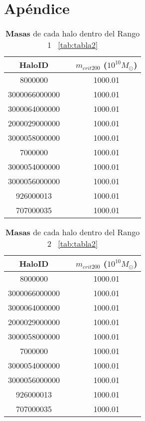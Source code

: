 \section*{Apéndice} 
\label{sec:apendice} %


\begin{table}[H]
\begin{center}
\begin{tabular}{ccc}
\toprule
\cellcolor[gray]{0.9}HaloID & & \cellcolor[gray]{0.9}$m_{crit200}$ ($10^{10}M_\odot$) \\
\midrule
8000000 & & 1000.01 \\
\midrule
3000066000000 & & 1000.01 \\
\midrule
3000064000000 & & 1000.01 \\
\midrule
2000029000000 & & 1000.01 \\
\midrule
3000058000000 & & 1000.01 \\
\midrule
7000000 & & 1000.01 \\
\midrule
3000054000000 & & 1000.01 \\
\midrule
3000056000000 & & 1000.01 \\
\midrule
926000013 & & 1000.01 \\
\midrule
707000035 & & 1000.01 \\
\bottomrule
\end{tabular}
\end{center}
\caption{\textbf{Masas} de cada halo dentro del Rango 1 ~\ref{tab:tabla2}}
\label{tab:tabla3}
\end{table}

\begin{table}[H]
\begin{center}
\begin{tabular}{ccc}
\toprule
\cellcolor[gray]{0.9}HaloID & & \cellcolor[gray]{0.9}$m_{crit200}$ ($10^{10}M_\odot$) \\
\midrule
8000000 & & 1000.01 \\
\midrule
3000066000000 & & 1000.01 \\
\midrule
3000064000000 & & 1000.01 \\
\midrule
2000029000000 & & 1000.01 \\
\midrule
3000058000000 & & 1000.01 \\
\midrule
7000000 & & 1000.01 \\
\midrule
3000054000000 & & 1000.01 \\
\midrule
3000056000000 & & 1000.01 \\
\midrule
926000013 & & 1000.01 \\
\midrule
707000035 & & 1000.01 \\
\bottomrule
\end{tabular}
\end{center}
\caption{\textbf{Masas} de cada halo dentro del Rango 2 ~\ref{tab:tabla2}}
\label{tab:tabla3}
\end{table}

